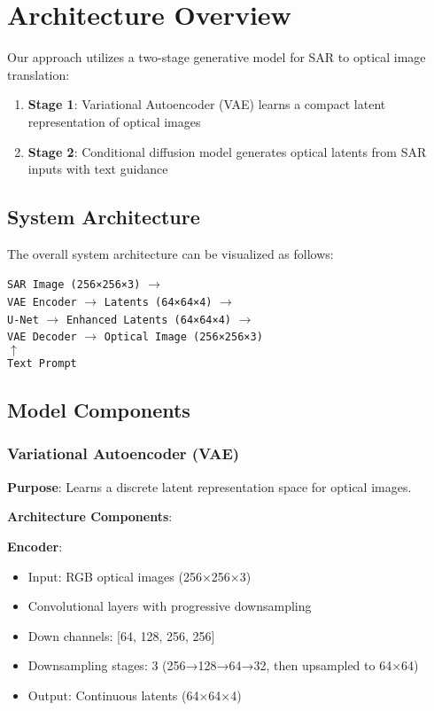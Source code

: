 \section{Architecture Overview}

Our approach utilizes a two-stage generative model for SAR to optical image translation:

\begin{enumerate}
    \item \textbf{Stage 1}: Variational Autoencoder (VAE) learns a compact latent representation of optical images
    \item \textbf{Stage 2}: Conditional diffusion model generates optical latents from SAR inputs with text guidance
\end{enumerate}

\subsection{System Architecture}

The overall system architecture can be visualized as follows:

\begin{center}
\texttt{SAR Image (256×256×3)} $\rightarrow$ \\
\texttt{VAE Encoder} $\rightarrow$ \texttt{Latents (64×64×4)} $\rightarrow$ \\
\texttt{U-Net} $\rightarrow$ \texttt{Enhanced Latents (64×64×4)} $\rightarrow$ \\
\texttt{VAE Decoder} $\rightarrow$ \texttt{Optical Image (256×256×3)} \\
$\uparrow$ \\
\texttt{Text Prompt}
\end{center}

\subsection{Model Components}

\subsubsection{Variational Autoencoder (VAE)}

\textbf{Purpose}: Learns a discrete latent representation space for optical images.

\textbf{Architecture Components}:

\textbf{Encoder}:
\begin{itemize}
    \item Input: RGB optical images (256×256×3)
    \item Convolutional layers with progressive downsampling
    \item Down channels: [64, 128, 256, 256]
    \item Downsampling stages: 3 (256→128→64→32, then upsampled to 64×64)
    \item Output: Continuous latents (64×64×4)
\end{itemize}


